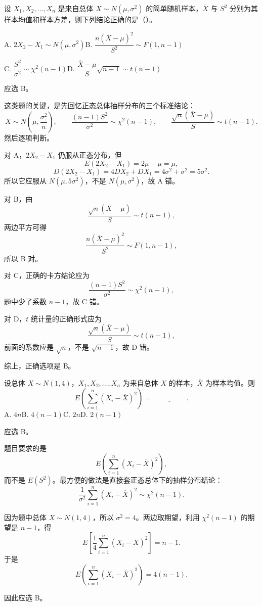 ﻿\documentclass[lang=cn,11pt]{elegantbook}
\begin{document}
\begin{exercise}\label{exer:6-normal-judge}
设 \(X_1, X_2, \dots, X_n\) 是来自总体 \(X \sim N(\mu, \sigma^2)\) 的简单随机样本，\(\overline{X}\) 与 \(S^2\) 分别为其样本均值和样本方差，则下列结论正确的是（\quad）。\par
A. \(2X_2 - X_1 \sim N(\mu, \sigma^2)\)\quad B. \(\dfrac{n(\overline{X}-\mu)^2}{S^2} \sim F(1,n-1)\)\par
C. \(\dfrac{S^2}{\sigma^2} \sim \chi^2(n-1)\)\quad D. \(\dfrac{\overline{X}-\mu}{S}\sqrt{n-1} \sim t(n-1)\)
\end{exercise}
\begin{solution}
应选 B。

这类题的关键，是先回忆正态总体抽样分布的三个标准结论：
\[
\overline{X}\sim N\!\left(\mu,\frac{\sigma^2}{n}\right),\qquad
\frac{(n-1)S^2}{\sigma^2}\sim\chi^2(n-1),\qquad
\frac{\sqrt{n}(\overline{X}-\mu)}{S}\sim t(n-1).
\]
然后逐项判断。

对 A，\(2X_2-X_1\) 仍服从正态分布，但
\[
E(2X_2-X_1)=2\mu-\mu=\mu,
\]
\[
D(2X_2-X_1)=4DX_2+DX_1=4\sigma^2+\sigma^2=5\sigma^2.
\]
所以它应服从 \(N(\mu,5\sigma^2)\)，不是 \(N(\mu,\sigma^2)\)，故 A 错。

对 B，由
\[
\frac{\sqrt{n}(\overline{X}-\mu)}{S}\sim t(n-1),
\]
两边平方可得
\[
\frac{n(\overline{X}-\mu)^2}{S^2}\sim F(1,n-1),
\]
所以 B 对。

对 C，正确的卡方结论应为
\[
\frac{(n-1)S^2}{\sigma^2}\sim\chi^2(n-1),
\]
题中少了系数 \(n-1\)，故 C 错。

对 D，\(t\) 统计量的正确形式应为
\[
\frac{\sqrt{n}(\overline{X}-\mu)}{S}\sim t(n-1),
\]
前面的系数应是 \(\sqrt{n}\)，不是 \(\sqrt{n-1}\)，故 D 错。

综上，正确选项是 B。
\end{solution}



\begin{exercise}\label{exer:6-esum-sq}
设总体 \(X \sim N(1, 4)\)，\(X_1, X_2, \dots, X_n\) 为来自总体 \(X\) 的样本，\(\overline{X}\) 为样本均值。则
\[
E\!\left(\sum_{i=1}^{n}(X_i-\overline{X})^2\right)=\underline{\hspace{2cm}}.
\]
A. \(4n\)\quad B. \(4(n-1)\)\quad C. \(2n\)\quad D. \(2(n-1)\)
\end{exercise}

\begin{solution}
应选 B。

题目要求的是
\[
E\!\left(\sum_{i=1}^{n}(X_i-\overline{X})^2\right),
\]
而不是 \(E(S^2)\)。最方便的做法是直接套正态总体下的抽样分布结论：
\[
\frac{1}{\sigma^2}\sum_{i=1}^{n}(X_i-\overline{X})^2 \sim \chi^2(n-1).
\]

因为题中总体 \(X\sim N(1,4)\)，所以 \(\sigma^2=4\)。两边取期望，利用 \(\chi^2(n-1)\) 的期望是 \(n-1\)，得
\[
E\!\left[\frac{1}{4}\sum_{i=1}^{n}(X_i-\overline{X})^2\right]=n-1.
\]
于是
\[
E\!\left(\sum_{i=1}^{n}(X_i-\overline{X})^2\right)=4(n-1).
\]

因此应选 B。
\end{solution}
\end{document}
